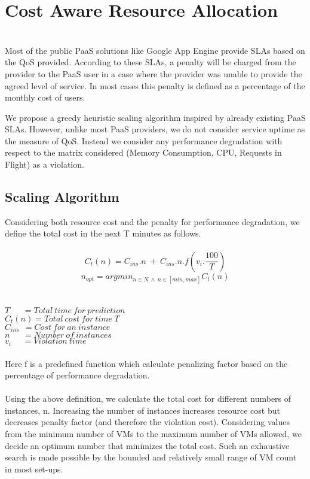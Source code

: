 \section{Cost Aware Resource Allocation}\\
Most of the public PaaS solutions like Google App Engine provide SLAs based on the QoS provided. According to these SLAs, a penalty will be charged from the provider to the PaaS user in a case where the provider was unable to provide the agreed level of service. In most cases this penalty is defined as a percentage of the monthly cost of users.

We propose a greedy heuristic scaling algorithm inspired by already existing PaaS SLAs. However, unlike most PaaS providers, we do not consider service uptime as the measure of QoS. Instead we consider any performance degradation with respect to the matrix considered (Memory Consumption, CPU, Requests in Flight) as a violation.

\subsection{Scaling Algorithm}
Considering both resource cost and the penalty for performance degradation, we define the total cost in the next T minutes as follows.\\
\\
\textbf{$$ C_t(n) = C_{ins}.n \  + \  C_{ins} . n . f(v_i. \frac{100}{T}) $$}
\textbf{$$n_{opt} = argmin_{n \in N \ \land \ n \in [min, max]}C_t(n)$$} \\
\\
$T\ \ \ \ \ \ \ = Total\ time\ for\ prediction $ \\
$C_t(n)  = Total\ cost\ for\ time\ T $ \\
$C_{ins}\ \ = Cost\ for\ an\ instance$   \\
$n\ \ \ \ \ \ \       = Number\ of\ instances $  \\
$v_i\ \ \ \ \ \    = Violation\ time $ \\
\\
Here f is a predefined function which calculate penalizing factor based on the percentage of performance degradation.\\
\\
Using the above definition, we calculate the total cost for different numbers of instances, n. Increasing the number of instances increases resource cost but decreases penalty factor (and therefore the violation cost). Considering values from the minimum number of VMs to the maximum number of VMs allowed, we decide an optimum number that minimizes the total cost. Such an exhaustive search is made possible by the bounded and relatively small range of VM count in most set-ups.
